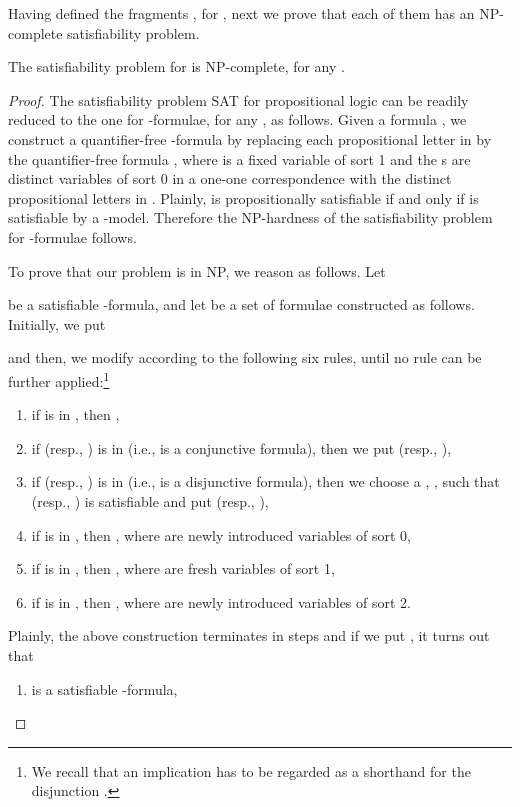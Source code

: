 \documentclass{fundam}
\begin{document}
Having defined the fragments , for , next we
prove that each of them has an \textsf{NP}-complete satisfiability
problem.
\begin{theorem}
The satisfiability problem for  is
\textsf{NP}-complete, for any .
\end{theorem}
\begin{proof}
The satisfiability problem \textsf{SAT} for propositional logic can be
readily reduced to the one for -formulae, for any , as follows. Given a formula , we
construct a quantifier-free -formula 
by replacing each propositional letter  in  by the
quantifier-free formula , where  is a fixed
variable of sort 1 and the s are distinct variables of sort
0 in a one-one correspondence with the distinct propositional
letters in . Plainly,  is propositionally satisfiable if
and only if  is satisfiable by a -model.
Therefore the \textsf{NP}-hardness of the satisfiability problem for
-formulae follows.

To prove that our problem is in \textsf{NP}, we reason as follows.
Let

be a satisfiable -formula, and let  be a set of
formulae constructed as follows.  Initially, we put

and then, we modify  according to the following six rules, until
no rule can be further applied:\footnote{We recall that an
implication  has to be regarded as a shorthand for
the disjunction .}
\begin{enumerate}[~~R1:]
\item if  is in , then ,

\item if  (resp., ) is in  (i.e.,  is a conjunctive formula), then
we put 
(resp., ),

\item if  (resp., ) is in  (i.e.,  is a disjunctive formula), then
we choose a , , such that  (resp., )
is satisfiable and put  (resp., ),

\item if 
is in , then ,
where  are newly introduced variables of
sort 0,

\item if 
is in , then ,
where  are fresh variables of sort 1,

\item if  is in , then ,
where  are newly introduced variables
of sort 2.
\end{enumerate}
Plainly, the above construction terminates in 
steps and if we put , it turns
out that
\begin{enumerate}[~~~~(a)]
\item  is a satisfiable -formula,


\end{enumerate}
\end{proof}
\end{document}
